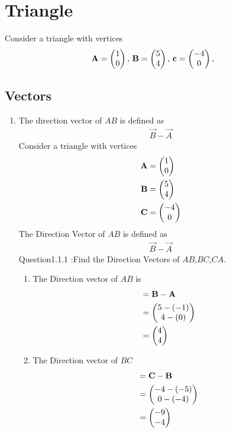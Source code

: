 \documentclass[11pt]{book}
\begin{document}
\frontmatter
\tableofcontents
\setcounter{page}{1}
\mainmatter
\chapter{Triangle}
Consider a triangle with vertices
\begin{align}
\label{eq:tri-pts}
\vec{A}=\myvec{1 \\ 0},\,
\vec{B}=\myvec{5\\4},\,
	\vec{c}=\myvec{-4\\0},\,
\end{align}

\section{Vectors}


\begin{enumerate}[label=\thesection.\arabic*.,ref=\thesection.\theenumi]

\item The direction vector of $AB$ is defined as
		\begin{align}
			\vec{B}-
			\vec{A}
		\end{align}
Consider a triangle with vertices
\begin{align} 
 \mathbf{A} &= \begin{pmatrix} 1\\ 0 \end{pmatrix} \\ \mathbf{B} &= \begin{pmatrix} 5\\ 4 \end{pmatrix}
  \\\mathbf{C} &= \begin{pmatrix} -4\\ 0\end{pmatrix}
 \end{align}
The Direction Vector of $AB$ is defined as 
\begin{align} 
\vec{B} - \vec{A}
\end{align}
Question1.1.1 :Find the Direction Vectors of $AB$,$BC$,$CA$.\\
\solution

\begin{enumerate} 
\item  The Direction vector of $AB$ is \begin{align} &= \mathbf{B} - \mathbf{A} \\
 &= \begin{pmatrix}5 - (-1)\\ 4 - (0) \end{pmatrix} \\&= \begin{pmatrix} 4\\ 4 \end{pmatrix}
 \end{align}
 
\item The Direction vector of $BC$ \begin{align}&= \vec{C} - \vec{B}\\
 &= \myvec{ -4 - (-5)\\ 0 - (-4) } \\&= \myvec{-9 \\ -4 }
  \end{align}
  

\end{enumerate}
\end{enumerate}
\end{document}
